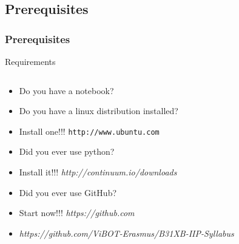 \documentclass{beamer}
\begin{document}
\subsection{Prerequisites}

\begin{frame}
  \frametitle{Prerequisites}
  \begin{block}{Requirements}
    \begin{columns}
      \begin{column}{.75\linewidth}
        \begin{itemize}
        \item<1-> Do you have a notebook?
        \item<2-> Do you have a linux distribution installed?
        \item<3->[$\rightarrow$] Install one!!! \texttt{http://www.ubuntu.com}
        \item<4-> Did you ever use python?
        \item<5->[$\rightarrow$] Install it!!! \textit{http://continuum.io/downloads}
        \item<6-> Did you ever use GitHub?
        \item<7->[$\rightarrow$] Start now!!! \textit{https://github.com}
        \item<7-> \textit{https://github.com/ViBOT-Erasmus/B31XB-IIP-Syllabus}
        \end{itemize}
      \end{column}
      \begin{column}{.3\linewidth}
\end{column}
\end{columns}
\end{block}
\end{frame}
\end{document}
